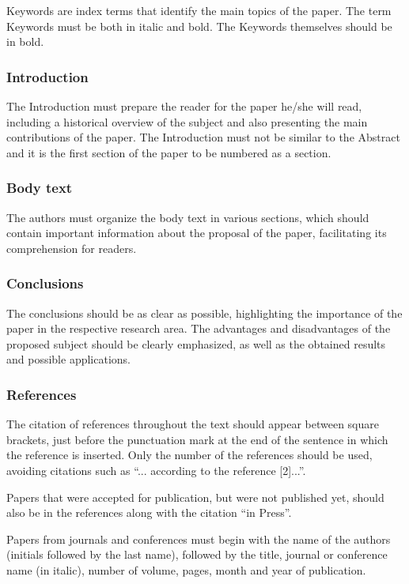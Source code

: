 \documentclass[english]{sobraep}
\begin{document}
Keywords are index terms that identify the main topics of the paper. The term Keywords must be both in italic and bold. The Keywords themselves should be in bold.

\subsubsection{Introduction}

The Introduction must prepare the reader for the paper he/she will read, including a historical overview of the subject and also presenting the main contributions of the paper. The Introduction must not be similar to the Abstract and it is the first section of the paper to be numbered as a section.

\subsubsection{Body text}

The authors must organize the body text in various sections, which should contain important information about the proposal of the paper, facilitating its comprehension for readers.

\subsubsection{Conclusions}

The conclusions should be as clear as possible, highlighting the importance of the paper in the respective research area. The advantages and disadvantages of the proposed subject should be clearly emphasized, as well as the obtained results and possible applications.

\subsubsection{References}

The citation of references throughout the text should appear between square brackets, just before the punctuation mark at the end of the sentence in which the reference is inserted. Only the number of the references should be used, avoiding citations such as ``... according to the reference [2]...''.

Papers that were accepted for publication, but were not published yet, should also be in the references along with the citation ``in Press''.

Papers from journals and conferences must begin with the name of the authors (initials followed by the last name), followed by the title, journal or conference name (in italic), number of volume, pages, month and year of publication.
\end{document}

